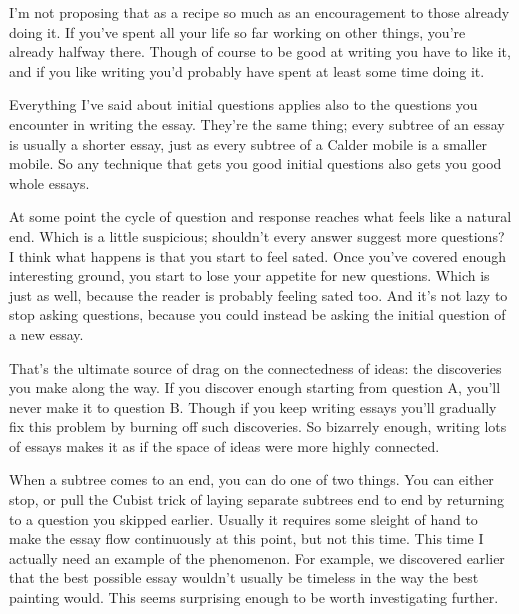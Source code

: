 I'm not proposing that as a recipe so much as an encouragement to those
already doing it. If you've spent all your life so far working on other
things, you're already halfway there. Though of course to be good at
writing you have to like it, and if you like writing you'd probably have
spent at least some time doing it.

Everything I've said about initial questions applies also to the
questions you encounter in writing the essay. They're the same thing;
every subtree of an essay is usually a shorter essay, just as every
subtree of a Calder mobile is a smaller mobile. So any technique that
gets you good initial questions also gets you good whole essays.

At some point the cycle of question and response reaches what feels like
a natural end. Which is a little suspicious; shouldn't every answer
suggest more questions? I think what happens is that you start to feel
sated. Once you've covered enough interesting ground, you start to lose
your appetite for new questions. Which is just as well, because the
reader is probably feeling sated too. And it's not lazy to stop asking
questions, because you could instead be asking the initial question of a
new essay.

That's the ultimate source of drag on the connectedness of ideas: the
discoveries you make along the way. If you discover enough starting from
question A, you'll never make it to question B. Though if you keep
writing essays you'll gradually fix this problem by burning off such
discoveries. So bizarrely enough, writing lots of essays makes it as if
the space of ideas were more highly connected.

When a subtree comes to an end, you can do one of two things. You can
either stop, or pull the Cubist trick of laying separate subtrees end to
end by returning to a question you skipped earlier. Usually it requires
some sleight of hand to make the essay flow continuously at this point,
but not this time. This time I actually need an example of the
phenomenon. For example, we discovered earlier that the best possible
essay wouldn't usually be timeless in the way the best painting would.
This seems surprising enough to be worth investigating further.

